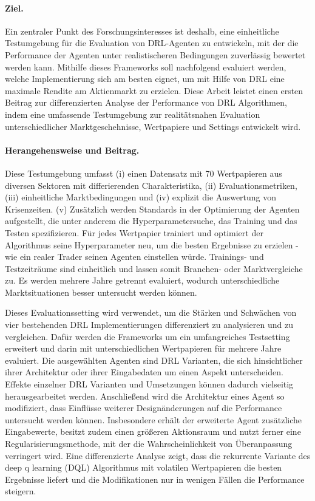 \paragraph{Ziel.} Ein zentraler Punkt des Forschungsinteresses ist deshalb, eine einheitliche Testumgebung für die Evaluation von \acs{DRL}-Agenten zu entwickeln, mit der die Performance der Agenten unter realistischeren Bedingungen zuverlässig bewertet werden kann.
Mithilfe dieses Frameworks soll nachfolgend evaluiert werden, welche Implementierung sich am besten eignet, um mit Hilfe von \acs{DRL} eine maximale Rendite am Aktienmarkt zu erzielen.
Diese Arbeit leistet einen ersten Beitrag zur differenzierten Analyse der Performance von \acs{DRL} Algorithmen, indem eine umfassende Testumgebung zur realitätsnahen Evaluation unterschiedlicher Marktgeschehnisse, Wertpapiere und Settings entwickelt wird.

\paragraph{Herangehensweise und Beitrag.} Diese Testumgebung umfasst (i) einen Datensatz mit 70 Wertpapieren aus diversen Sektoren mit differierenden Charakteristika, (ii) Evaluationsmetriken, (iii) einheitliche Marktbedingungen und (iv) explizit die Auswertung von Krisenzeiten. (v) Zusätzlich werden Standards in der Optimierung der Agenten aufgestellt, die unter anderem die Hyperparametersuche, das Training und das Testen spezifizieren.
Für jedes Wertpapier trainiert und optimiert der Algorithmus seine Hyperparameter neu, um die besten Ergebnisse zu erzielen - wie ein realer Trader seinen Agenten einstellen würde.
Trainings- und Testzeiträume sind einheitlich und lassen somit Branchen- oder Marktvergleiche zu. Es werden mehrere Jahre getrennt evaluiert, wodurch unterschiedliche Marktsituationen besser untersucht werden können.

Dieses Evaluationssetting wird verwendet, um die Stärken und Schwächen von vier bestehenden \acs{DRL} Implementierungen \parencite{repo1,repo2} differenziert zu analysieren und zu vergleichen.
Dafür werden die Frameworks um ein umfangreiches Testsetting erweitert und darin mit unterschiedlichen Wertpapieren für mehrere Jahre evaluiert.
Die ausgewählten Agenten sind \acs{DRL} Varianten, die sich hinsichtlicher ihrer Architektur oder ihrer Eingabedaten um einen Aspekt unterscheiden. Effekte einzelner \acs{DRL} Varianten und Umsetzungen können dadurch vielseitig herausgearbeitet werden. 
Anschlie\ss{}end wird die Architektur eines Agent so modifiziert, dass Einflüsse weiterer Designänderungen auf die Performance untersucht werden können. Insbesondere erhält der erweiterte Agent zusätzliche Eingabewerte, besitzt zudem einen größeren Aktionsraum und nutzt ferner eine Regularisierungsmethode, mit der die Wahrscheinlichkeit von Überanpassung verringert wird.
Eine differenzierte Analyse zeigt, dass die rekurrente Variante des deep q learning (\acs{DQL}) Algorithmus mit volatilen Wertpapieren die besten Ergebnisse liefert und die Modifikationen nur in wenigen Fällen die Performance steigern.

